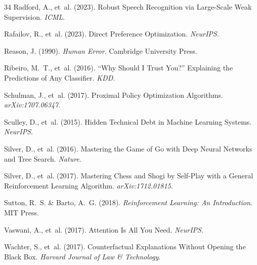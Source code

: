 \documentclass[11pt,a4paper]{article}
\begin{document}
\begin{thebibliography}{34}
Radford, A., et~al. (2023).
\newblock Robust Speech Recognition via Large-Scale Weak Supervision.
\newblock \emph{ICML}.

Rafailov, R., et~al. (2023).
\newblock Direct Preference Optimization.
\newblock \emph{NeurIPS}.

Reason, J. (1990).
\newblock \emph{Human Error}.
\newblock Cambridge University Press.

Ribeiro, M.~T., et~al. (2016).
\newblock ``Why Should I Trust You?'' Explaining the Predictions of Any Classifier.
\newblock \emph{KDD}.

Schulman, J., et~al. (2017).
\newblock Proximal Policy Optimization Algorithms.
\newblock \emph{arXiv:1707.06347}.

Sculley, D., et~al. (2015).
\newblock Hidden Technical Debt in Machine Learning Systems.
\newblock \emph{NeurIPS}.

Silver, D., et~al. (2016).
\newblock Mastering the Game of Go with Deep Neural Networks and Tree Search.
\newblock \emph{Nature}.

Silver, D., et~al. (2017).
\newblock Mastering Chess and Shogi by Self-Play with a General Reinforcement Learning Algorithm.
\newblock \emph{arXiv:1712.01815}.

Sutton, R.~S. \& Barto, A.~G. (2018).
\newblock \emph{Reinforcement Learning: An Introduction}.
\newblock MIT Press.

Vaswani, A., et~al. (2017).
\newblock Attention Is All You Need.
\newblock \emph{NeurIPS}.

Wachter, S., et~al. (2017).
\newblock Counterfactual Explanations Without Opening the Black Box.
\newblock \emph{Harvard Journal of Law \& Technology}.

\end{thebibliography}
\end{document}
